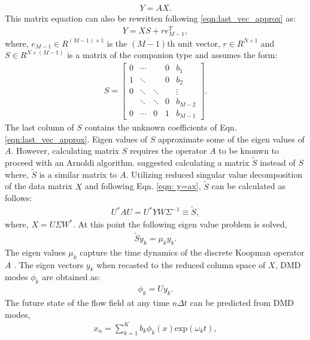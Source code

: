 \documentclass{article}
\begin{document}
\begin{align}
 Y = A X.
\label{eqn: y=ax}
\end{align}
This matrix equation can also be rewritten following \ref{eqn:last_vec_approx} as:
\begin{align}
  Y =X S + r e^{T}_{M-1},
\end{align}
where, $e_{M-1} \in R^{(M-1) \times 1}$ is the $(M-1)$th unit vector, $r \in R^{N \times 1}$ and $S \in R^{N \times (M-1)}$ is a matrix of the companion type and assumes the form:
\begin{align}
S =
    \begin{bmatrix}
        0 & \cdots &        & 0  & b_1\\
        1 & \ddots &        & 0  & b_2 \\
        0 & \ddots & \ddots &    & \vdots \\
          & \ddots & \ddots & 0  & b_{M-2} \\
        0 & \cdots & 0      & 1  & b_{M-1}
    \end{bmatrix}.
\end{align}
The last column of $S$ contains the unknown coefficients of Eqn. \ref{eqn:last_vec_approx}. Eigen values of $S$ approximate some of the eigen values of $A$. However, calculating matrix $S$ requires the operator $A$ to be knonwn to proceed with an Arnoldi algorithm. \citet{schmid_jfm2010} suggested calculating a matrix $\tilde{S}$ instead of $S$ where, $\tilde{S}$ is a similar matrix to $A$. Utilizing reduced singular value decomposition of the data matrix $X$ and following Eqn. \ref{eqn: y=ax}, $\tilde{S}$ can be calculated as follows:
\begin{align}
U^{*} A U  = U^{*} YW  \Sigma^{-1} \equiv \tilde{S},
\end{align}
where, $X=U\Sigma W^{*}$. At this point the following eigen value problem is solved,
\begin{align}
\tilde{S}y_{k}  =  \mu_{k} y_{k} .
\end{align}
The eigen values $\mu_{k}$ capture the time dynamics of the discrete Koopman operator $A$ \citep{kutz_book2013}. The eigen vectors $y_{k}$ when recasted to the reduced column space of $X$, DMD modes $\phi_{k}$ are obtained as:
\begin{align}
\phi_{k} = Uy_{k}.
\end{align}
The future state of the flow field at any time $n \Delta t$ can be predicted from DMD modes, 
\begin{align}
x_{n} = \sum_{k=1}^{K} b_{k} \phi_{k}(x) \text{exp}(\omega_{k} t),
\end{align}
\end{document}
